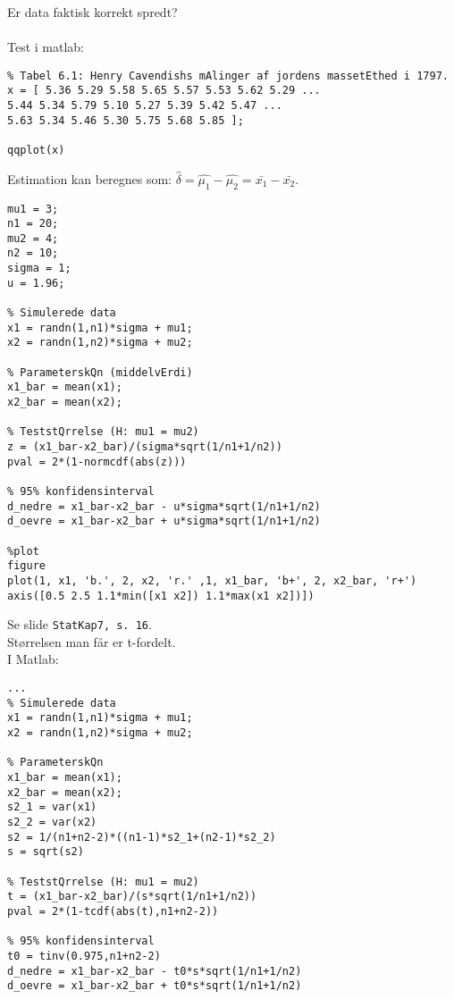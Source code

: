 \documentclass[Main]{subfiles}
\begin{document}
\begin{theo}[Fraktilsammenligning]
Er data faktisk korrekt spredt?
\\
\\
Test i matlab:
\\
\begin{lstlisting}[style=Code-Matlab]
%% Eksempel 4 - t-test: jordens massefylde
% Tabel 6.1: Henry Cavendishs mAlinger af jordens massetEthed i 1797.
x = [ 5.36 5.29 5.58 5.65 5.57 5.53 5.62 5.29 ...
5.44 5.34 5.79 5.10 5.27 5.39 5.42 5.47 ...
5.63 5.34 5.46 5.30 5.75 5.68 5.85 ];

qqplot(x)
\end{lstlisting}
\end{theo}


\begin{theo}[Estimation]
Estimation kan beregnes som: $\hat{\delta} = \hat{\mu_1} - \hat{\mu_2} = \bar{x_1}-\bar{x_2}$.

\begin{lstlisting}[style=Code-Matlab]
%% Eksempel 1 - sammenligning af to middelvErdier (kendt varians)
mu1 = 3;
n1 = 20;
mu2 = 4;
n2 = 10;
sigma = 1;
u = 1.96;

% Simulerede data
x1 = randn(1,n1)*sigma + mu1;
x2 = randn(1,n2)*sigma + mu2;

% ParameterskQn (middelvErdi)
x1_bar = mean(x1);
x2_bar = mean(x2);

% TeststQrrelse (H: mu1 = mu2)
z = (x1_bar-x2_bar)/(sigma*sqrt(1/n1+1/n2))
pval = 2*(1-normcdf(abs(z)))

% 95% konfidensinterval
d_nedre = x1_bar-x2_bar - u*sigma*sqrt(1/n1+1/n2)
d_oevre = x1_bar-x2_bar + u*sigma*sqrt(1/n1+1/n2)

%plot
figure
plot(1, x1, 'b.', 2, x2, 'r.' ,1, x1_bar, 'b+', 2, x2_bar, 'r+')
axis([0.5 2.5 1.1*min([x1 x2]) 1.1*max(x1 x2])])

\end{lstlisting}
\end{theo}


\begin{theo}
Se slide \texttt{StatKap7, s. 16}.
\\
Størrelsen man får er t-fordelt. 
\\I Matlab:
\begin{lstlisting}[style=Code-Matlab]
%% Eksempel 2 - sammenligning af to middelvErdier (ukendt varians)
...
% Simulerede data
x1 = randn(1,n1)*sigma + mu1;
x2 = randn(1,n2)*sigma + mu2;

% ParameterskQn
x1_bar = mean(x1);
x2_bar = mean(x2);
s2_1 = var(x1)
s2_2 = var(x2)
s2 = 1/(n1+n2-2)*((n1-1)*s2_1+(n2-1)*s2_2)
s = sqrt(s2)

% TeststQrrelse (H: mu1 = mu2)
t = (x1_bar-x2_bar)/(s*sqrt(1/n1+1/n2))
pval = 2*(1-tcdf(abs(t),n1+n2-2))

% 95% konfidensinterval
t0 = tinv(0.975,n1+n2-2)
d_nedre = x1_bar-x2_bar - t0*s*sqrt(1/n1+1/n2)
d_oevre = x1_bar-x2_bar + t0*s*sqrt(1/n1+1/n2)
\end{lstlisting}

\end{theo}
\end{document}
